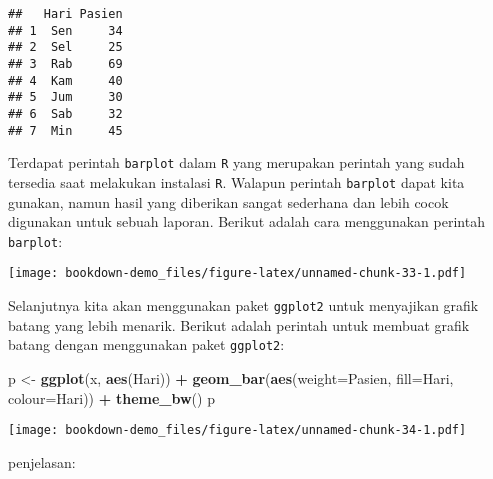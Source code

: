 \documentclass[
]{book}
\newenvironment{Shaded}{\begin{snugshade}}{\end{snugshade}}
\newcommand{\DataTypeTok}[1]{\textcolor[rgb]{0.13,0.29,0.53}{#1}}
\newcommand{\KeywordTok}[1]{\textcolor[rgb]{0.13,0.29,0.53}{\textbf{#1}}}
\newcommand{\NormalTok}[1]{#1}
\newcommand{\OperatorTok}[1]{\textcolor[rgb]{0.81,0.36,0.00}{\textbf{#1}}}
\newcommand{\StringTok}[1]{\textcolor[rgb]{0.31,0.60,0.02}{#1}}
\begin{document}
\begin{verbatim}
##   Hari Pasien
## 1  Sen     34
## 2  Sel     25
## 3  Rab     69
## 4  Kam     40
## 5  Jum     30
## 6  Sab     32
## 7  Min     45
\end{verbatim}

Terdapat perintah \texttt{barplot} dalam \texttt{R} yang merupakan perintah yang sudah tersedia saat melakukan instalasi \texttt{R}. Walapun perintah \texttt{barplot} dapat kita gunakan, namun hasil yang diberikan sangat sederhana dan lebih cocok digunakan untuk sebuah laporan. Berikut adalah cara menggunakan perintah \texttt{barplot}:

\begin{Shaded}
\end{Shaded}

\texttt{[image: bookdown-demo\_files/figure-latex/unnamed-chunk-33-1.pdf]}

Selanjutnya kita akan menggunakan paket \texttt{ggplot2} untuk menyajikan grafik batang yang lebih menarik. Berikut adalah perintah untuk membuat grafik batang dengan menggunakan paket \texttt{ggplot2}:

\begin{Shaded}
\begin{Highlighting}[]
\NormalTok{p <-}\StringTok{ }\KeywordTok{ggplot}\NormalTok{(x, }\KeywordTok{aes}\NormalTok{(Hari)) }\OperatorTok{+}\StringTok{ }
\StringTok{  }\KeywordTok{geom_bar}\NormalTok{(}\KeywordTok{aes}\NormalTok{(}\DataTypeTok{weight=}\NormalTok{Pasien, }\DataTypeTok{fill=}\NormalTok{Hari, }\DataTypeTok{colour=}\NormalTok{Hari)) }\OperatorTok{+}
\StringTok{  }\KeywordTok{theme_bw}\NormalTok{()}
\NormalTok{p}
\end{Highlighting}
\end{Shaded}

\texttt{[image: bookdown-demo\_files/figure-latex/unnamed-chunk-34-1.pdf]}

penjelasan:
\end{document}
